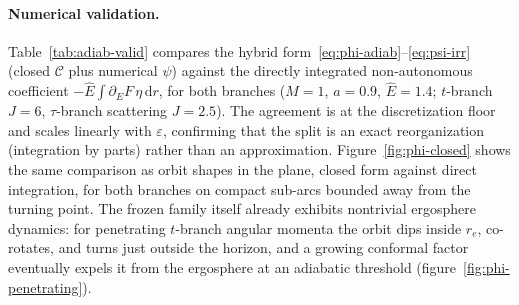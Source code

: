 \documentclass[12pt]{iopart}
\theoremstyle{plain}
\theoremstyle{definition}
\theoremstyle{remark}
\newcommand{\Ehat}{\hat E}
\newcommand{\dd}{\mathrm{d}}
\begin{document}
\paragraph{Numerical validation.} Table~\ref{tab:adiab-valid} compares the
hybrid form~\eqref{eq:phi-adiab}--\eqref{eq:psi-irr} (closed
$\mathcal{C}$ plus numerical $\psi$) against the directly integrated non-autonomous
coefficient $-\Ehat\!\int\partial_E F\,\eta\,\dd r$, for both branches
($M=1$, $a=0.9$, $\Ehat=1.4$; $t$-branch $J=6$, $\tau$-branch scattering $J=2.5$).
The agreement is at the discretization floor and scales linearly with
$\varepsilon$, confirming that the split is an exact reorganization (integration by
parts) rather than an approximation. Figure~\ref{fig:phi-closed} shows the same
comparison as orbit shapes in the plane, closed form against direct integration,
for both branches on compact sub-arcs bounded away from the turning point. The frozen family
itself already exhibits nontrivial ergosphere dynamics: for penetrating $t$-branch
angular momenta the orbit dips inside $r_e$, co-rotates, and turns just outside the
horizon, and a growing conformal factor eventually expels it from the ergosphere at
an adiabatic threshold (figure~\ref{fig:phi-penetrating}).
\end{document}
